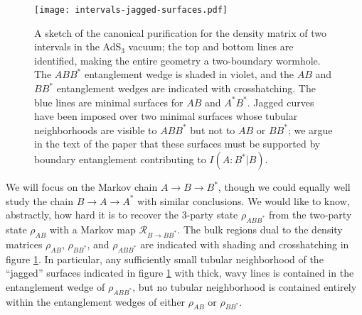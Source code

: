 \documentclass[a4paper,11pt]{article}
\begin{document}
\begin{figure}
    \centering
    \texttt{[image: intervals-jagged-surfaces.pdf]}
    \caption{A sketch of the canonical purification for the density matrix of two intervals in the AdS$_3$ vacuum; the top and bottom lines are identified, making the entire geometry a two-boundary wormhole. The $ABB^*$ entanglement wedge is shaded in violet, and the $AB$ and $BB^*$ entanglement wedges are indicated with crosshatching. The blue lines are minimal surfaces for $AB$ and $A^* B^*$. Jagged curves have been imposed over two minimal surfaces whose tubular neighborhoods are visible to $ABB^*$ but not to $AB$ or $BB^*$; we argue in the text of the paper that these surfaces must be supported by boundary entanglement contributing to $I(A:B^*|B).$}
    \label{fig:intervals-jagged-surfaces}
\end{figure}

We will focus on the Markov chain $A \rightarrow B \rightarrow B^*$, though we could equally well study the chain $B \rightarrow A \rightarrow A^*$ with similar conclusions. We would like to know, abstractly, how hard it is to recover the 3-party state $\rho_{ABB^*}$ from the two-party state $\rho_{AB}$ with a Markov map $\mathcal{R}_{B \rightarrow B B^*}.$ The bulk regions dual to the density matrices $\rho_{AB}$, $\rho_{BB^*}$, and $\rho_{ABB^*}$ are indicated with shading and crosshatching in figure \ref{fig:intervals-jagged-surfaces}. In particular, any sufficiently small tubular neighborhood of the ``jagged'' surfaces indicated in figure \ref{fig:intervals-jagged-surfaces} with thick, wavy lines is contained in the entanglement wedge of $\rho_{ABB^*}$, but no tubular neighborhood is contained entirely within the entanglement wedges of either $\rho_{AB}$ or $\rho_{BB^*}$.
\end{document}

